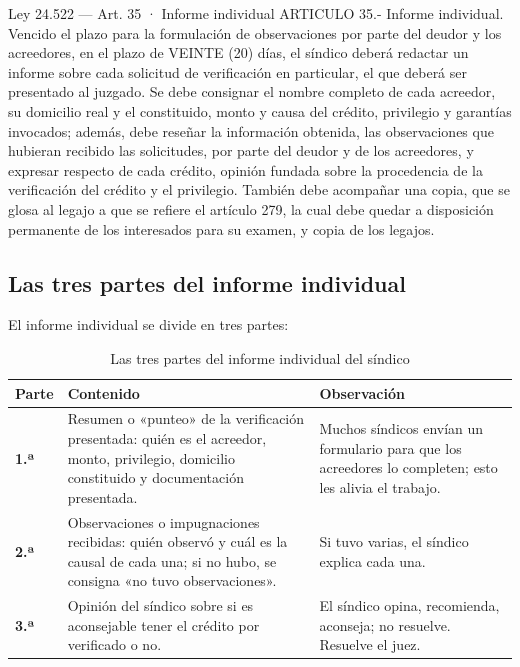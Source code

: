 \documentclass[12pt,oneside]{book}
\begin{document}
\begin{legal}{Ley 24.522 — Art. 35 · Informe individual}
ARTICULO 35.- Informe individual. Vencido el plazo para la formulación de observaciones por parte del deudor y los acreedores, en el plazo de VEINTE (20) días, el síndico deberá redactar un informe sobre cada solicitud de verificación en particular, el que deberá ser presentado al juzgado. Se debe consignar el nombre completo de cada acreedor, su domicilio real y el constituido, monto y causa del crédito, privilegio y garantías invocados; además, debe reseñar la información obtenida, las observaciones que hubieran recibido las solicitudes, por parte del deudor y de los acreedores, y expresar respecto de cada crédito, opinión fundada sobre la procedencia de la verificación del crédito y el privilegio. También debe acompañar una copia, que se glosa al legajo a que se refiere el artículo 279, la cual debe quedar a disposición permanente de los interesados para su examen, y copia de los legajos.
\end{legal}

\subsection{Las tres partes del informe individual}

El informe individual se divide en tres partes:

\begin{table}[H]
\centering
\small
\caption{Las tres partes del informe individual del síndico}
\begin{tabularx}{\textwidth}{>{\raggedright\arraybackslash\bfseries}p{1.3cm}>{\raggedright\arraybackslash}X>{\raggedright\arraybackslash}X}
\toprule
\textbf{Parte} & \textbf{Contenido} & \textbf{Observación} \\
\midrule
1.ª & Resumen o «punteo» de la verificación presentada: quién es el acreedor, monto, privilegio, domicilio constituido y documentación presentada. & Muchos síndicos envían un formulario para que los acreedores lo completen; esto les alivia el trabajo. \\
\addlinespace
2.ª & Observaciones o impugnaciones recibidas: quién observó y cuál es la causal de cada una; si no hubo, se consigna «no tuvo observaciones». & Si tuvo varias, el síndico explica cada una. \\
\addlinespace
3.ª & Opinión del síndico sobre si es aconsejable tener el crédito por verificado o no. & El síndico opina, recomienda, aconseja; no resuelve. Resuelve el juez. \\
\bottomrule
\end{tabularx}
\end{table}
\end{document}
